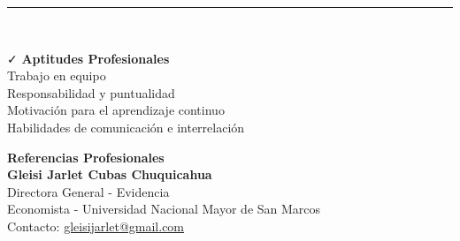 \documentclass{resume}
\begin{document}
{\color{vino} \noindent \rule{\textwidth}{1pt}} \\
\begin{minipage}{0.5\linewidth}
	\vspace{3pt}
	{\color{vino} \faCheck \; {\large \bf Aptitudes Profesionales}} \\
	\noindent Trabajo en equipo \\
	Responsabilidad y puntualidad \\
	Motivación para el aprendizaje continuo \\
	Habilidades de comunicación e interrelación
	\vspace{3pt}
\end{minipage}
\begin{minipage}{0.5\linewidth}
	\vspace{3pt}
	{\color{vino} \faCommenting \; {\large \bf Referencias Profesionales}} \\
	{\bf Gleisi Jarlet Cubas Chuquicahua} \\
	{Directora General - Evidencia} \\
	{Economista - Universidad Nacional Mayor de San Marcos} \\
	{Contacto: \href{mailto:gleisijarlet@gmail.com}{gleisijarlet@gmail.com}}
\end{minipage}
\end{document}
